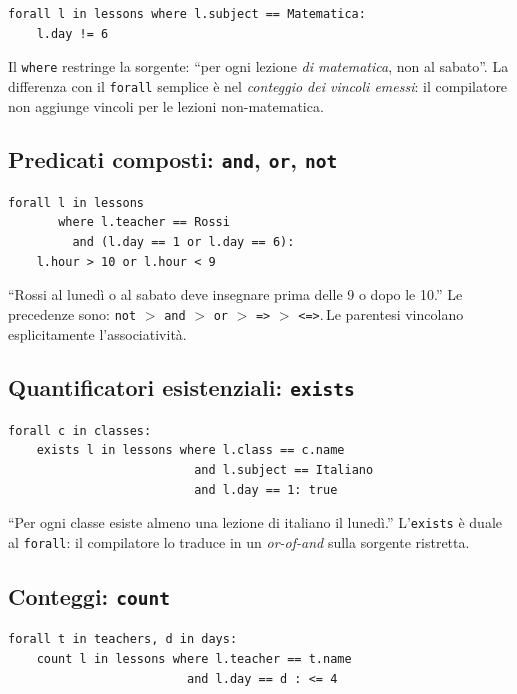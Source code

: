 \begin{lstlisting}[basicstyle=\ttfamily\small]
forall l in lessons where l.subject == Matematica:
    l.day != 6
\end{lstlisting}

Il \texttt{where} restringe la sorgente: ``per ogni lezione
\emph{di matematica}, non al sabato''. La differenza con il
\texttt{forall} semplice \`e nel \emph{conteggio dei vincoli
emessi}: il compilatore non aggiunge vincoli per le lezioni
non-matematica.

\subsection{Predicati composti: \texttt{and}, \texttt{or}, \texttt{not}}

\begin{lstlisting}[basicstyle=\ttfamily\small]
forall l in lessons
       where l.teacher == Rossi
         and (l.day == 1 or l.day == 6):
    l.hour > 10 or l.hour < 9
\end{lstlisting}

``Rossi al luned\`i o al sabato deve insegnare prima delle 9 o
dopo le 10.'' Le precedenze sono: \texttt{not} $>$ \texttt{and}
$>$ \texttt{or} $>$ \texttt{=>} $>$ \texttt{<=>}.\,Le parentesi
vincolano esplicitamente l'associativit\`a.

\subsection{Quantificatori esistenziali: \texttt{exists}}

\begin{lstlisting}[basicstyle=\ttfamily\small]
forall c in classes:
    exists l in lessons where l.class == c.name
                          and l.subject == Italiano
                          and l.day == 1: true
\end{lstlisting}

``Per ogni classe esiste almeno una lezione di italiano il
luned\`i.'' L'\texttt{exists} \`e duale al \texttt{forall}: il
compilatore lo traduce in un \emph{or-of-and} sulla sorgente
ristretta.

\subsection{Conteggi: \texttt{count}}

\begin{lstlisting}[basicstyle=\ttfamily\small]
forall t in teachers, d in days:
    count l in lessons where l.teacher == t.name
                         and l.day == d : <= 4
\end{lstlisting}

